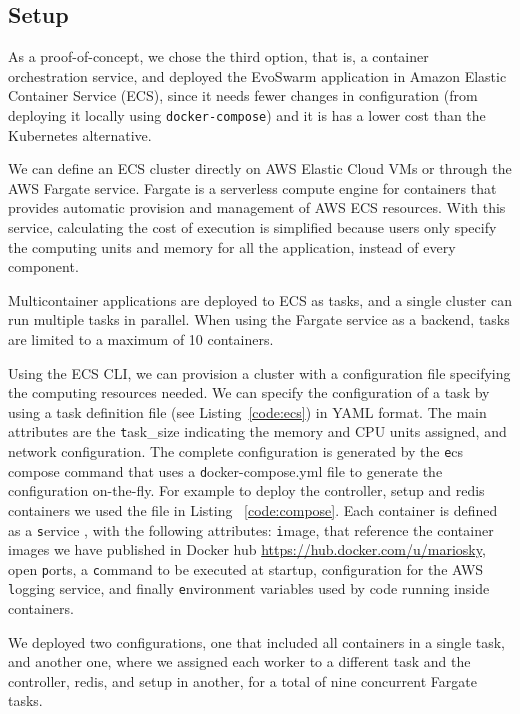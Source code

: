 \documentclass[review]{elsarticle}
\begin{document}
\subsection{Setup}

As a proof-of-concept, we chose the third option, that is, a container orchestration service, and deployed the EvoSwarm application in Amazon Elastic
Container Service (ECS),  since it needs fewer changes in configuration 
(from deploying it locally using {\tt docker-compose}) and it is has a lower cost than the Kubernetes alternative. %

We can define an ECS cluster directly on AWS Elastic Cloud VMs or through the AWS Fargate service.
Fargate is a serverless compute engine for containers that provides automatic provision 
and management of AWS ECS resources. With this service, calculating the cost of execution
is simplified because users only specify the computing units and memory for all the application,
instead of every component. 

Multicontainer applications are deployed to ECS as tasks, and a single cluster can run multiple tasks in
parallel. When using the Fargate service as a backend, tasks are limited to a
maximum of 10 containers.  

Using the ECS CLI, we can provision a cluster with a configuration file
specifying the computing resources needed. We can specify the configuration of a task 
by using a task definition file (see Listing~\ref{code:ecs}) in YAML format.
The main attributes are the {\texttt task\_size} indicating the memory and CPU units
assigned, and network configuration. The complete configuration is generated
by the {\texttt ecs compose command} that uses a {\texttt docker-compose.yml} file to generate 
the configuration on-the-fly. For example to deploy the controller, setup and redis 
containers we used the file in Listing ~\ref{code:compose}.
Each container is defined as a  {\texttt service} , with the following attributes: {\texttt image},
that reference the container images we have published in Docker hub
\url{https://hub.docker.com/u/mariosky}, open {\texttt ports}, a {\texttt command} to be executed at
startup, configuration for the AWS {\texttt logging} service, and finally {\texttt environment}
variables used by code running inside containers.


We deployed two configurations, one that included all containers in a single task,
and another one, where we assigned each worker to a different task and the controller, 
redis, and setup in another, for a total of nine concurrent Fargate tasks. 
\end{document}
